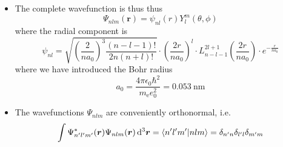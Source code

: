 \documentclass[11pt, a4paper]{article}
\newcommand{\diff}{\mathop{}\!\mathrm{d}} %
\newcommand{\dr}{\diff^{3} \r}  %
\renewcommand{\vec}[1]{\bm{#1}}  %
\renewcommand{\r}{\vec{r}}  %
\newcommand{\p}{\psi}  %
\renewcommand{\P}{\Psi}  %
\begin{document}
\begin{itemize}
	\item The complete wavefunction is thus thus
	\begin{equation*}
		\P_{nlm}(\r) = \p_{nl}(r)Y_{l}^{m}(\theta, \phi)
	\end{equation*}
	where the radial component is
	\begin{equation*}
		\p_{nl} = \sqrt{\left(\frac{2}{na_{0}}\right)^{3}\frac{(n - l - 1)!}{2n(n + l)!}}\cdot \left(\frac{2r}{na_{0}}\right)^{l}\cdot L_{n - l - 1}^{2l + 1} \left(\frac{2r}{na_{0}}\right)\cdot e^{-\frac{r}{na_{0}}}
	\end{equation*}
	where we have introduced the Bohr radius
	\begin{equation*}
		a_{0} = \frac{4\pi \epsilon_{0}\hbar^{2}}{m_{\text{e}} e_{0}^{2}} = \SI{0.053}{\nano \meter}
	\end{equation*}
	
	\item The wavefunctions $ \P_{nlm} $ are conveniently orthonormal, i.e.
	\begin{equation*}
		\int \P^{*}_{n'l'm'}(\r)\P_{nlm}(\r)\dr = \braket{n'l'm'}{nlm} = \delta_{n'n}\delta_{l'l}\delta_{m'm}
	\end{equation*}
\end{itemize}
\end{document}

